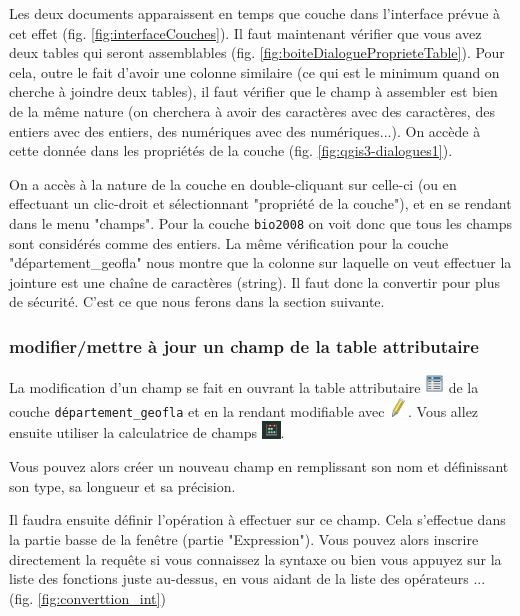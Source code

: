 \documentclass[a4paper, 11pt]{article}
\begin{document}
  Les deux documents apparaissent en temps que couche dans l'interface prévue à cet effet (fig. \ref{fig:interfaceCouches}). Il faut maintenant vérifier que vous avez deux tables qui seront assemblables (fig. \ref{fig:boiteDialogueProprieteTable}). Pour cela, outre le fait d'avoir une colonne similaire (ce qui est le minimum quand on cherche à joindre deux tables), il faut vérifier que le champ à assembler est bien de la même nature (on cherchera à avoir des caractères avec des caractères, des entiers avec des entiers, des numériques avec des numériques...). On accède à cette donnée dans les propriétés de la couche (fig. \ref{fig:qgis3-dialogues1}).

  On a accès à la nature de la couche en double-cliquant sur celle-ci (ou en effectuant un clic-droit et sélectionnant "propriété de la couche"), et en se rendant dans le menu "champs". Pour la couche \texttt{bio2008} on voit donc que tous les champs sont considérés comme des entiers.
  La même vérification pour la couche "département\_geofla" nous montre que la colonne sur laquelle on veut effectuer la jointure est une chaîne de caractères (string). Il faut donc la convertir pour plus de sécurité. C'est ce que nous ferons dans la section suivante.

  \subsubsection{modifier/mettre à jour un champ de la table attributaire}

  La modification d'un champ se fait en ouvrant la table attributaire \includegraphics[width=0.5cm]{img/mActionOpenTable} de la couche \texttt{département\_geofla}
et en la rendant modifiable avec \includegraphics[width=0.5cm]{img/mActionToggleEditing}. Vous allez ensuite utiliser la calculatrice de champs \includegraphics[width=0.5cm]{img/calcul_champ}.

  Vous pouvez alors créer un nouveau champ en remplissant son nom et définissant son type, sa longueur et sa précision.

  Il faudra ensuite définir l'opération à effectuer sur ce champ. Cela s'effectue dans la partie basse de la fenêtre (partie "Expression"). Vous pouvez alors inscrire directement la requête si vous connaissez la syntaxe ou bien vous appuyez sur la liste des fonctions juste au-dessus, en vous aidant de la liste des opérateurs ... (fig. \ref{fig:converttion_int})
\end{document}
